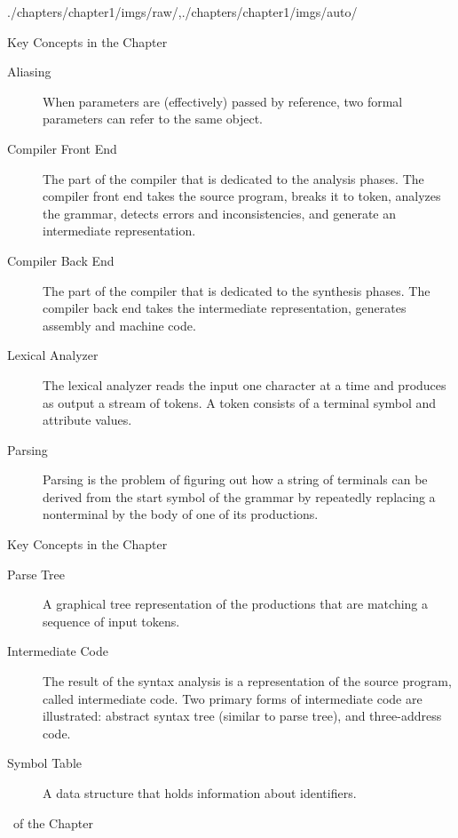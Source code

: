 \begin{graphicspathcontext}{{./chapters/chapter1/imgs/raw/},{./chapters/chapter1/imgs/auto/}}
\begin{bibunit}[apalike]
\begin{frame}[t]{{Key Concepts} in the Chapter \insertcontinuationtext}
	\begin{description}
		\item[Aliasing] When parameters are (effectively) passed by reference, two formal parameters can refer to the same object.
		\item[Compiler Front End] The part of the compiler that is dedicated to the analysis phases. The compiler front end takes the source program, breaks it to token, analyzes the grammar, detects errors and inconsistencies, and generate an intermediate representation.
		\item[Compiler Back End] The part of the compiler that is dedicated to the synthesis phases. The compiler back end takes the intermediate representation, generates assembly and machine code.
		\item[Lexical Analyzer] The lexical analyzer reads the input one character at a time and produces as output a stream of tokens. A token consists of a terminal symbol and attribute values.
		\item[Parsing] Parsing is the problem of figuring out how a string of terminals can be derived from the start symbol of the grammar by repeatedly replacing a nonterminal by the body of one of its productions.
	\end{description}
\end{frame}


\begin{frame}[t]{{Key Concepts} in the Chapter \insertcontinuationtext}
	\begin{description}
		\item[Parse Tree] A graphical tree representation of the productions that are matching a sequence of input tokens.
		\item[Intermediate Code] The result of the syntax analysis is a representation of the source program, called intermediate code. Two primary forms of intermediate code are illustrated: abstract syntax tree (similar to parse tree), and three-address code.
		\item[Symbol Table] A data structure that holds information about identifiers.
	\end{description}
\end{frame}

\begin{frame}[t]{{\bibname}\ of the Chapter}%
	\tiny%
\end{frame}%

\end{bibunit}
\end{graphicspathcontext}
